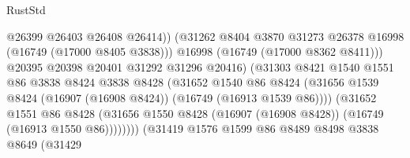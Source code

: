 \begin{lexlean}{RustStd}
\begin{coremodule}
                                            @26399
                                            @26403
                                            @26408
                                            @26414))
                                        (@31262
                                          @8404
                                          @3870
                                          @31273
                                          @26378
                                          @16998
                                          (@16749 (@17000 @8405 @3838)))
                                        @16998
                                        (@16749 (@17000 @8362 @8411)))
                                      @20395
                                      @20398
                                      @20401
                                      @31292
                                      @31296
                                      @20416)
                                    (@31303
                                      @8421
                                      @1540
                                      @1551
                                      @86
                                      @3838
                                      @8424
                                      @3838
                                      @8428
                                      (@31652
                                        @1540
                                        @86
                                        @8424
                                        (@31656
                                          @1539
                                          @8424
                                          (@16907 (@16908 @8424))
                                          (@16749 (@16913 @1539 @86))))
                                      (@31652
                                        @1551
                                        @86
                                        @8428
                                        (@31656
                                          @1550
                                          @8428
                                          (@16907 (@16908 @8428))
                                          (@16749 (@16913 @1550 @86))))))))
                              (@31419
                                @1576
                                @1599
                                @86
                                @8489
                                @8498
                                @3838
                                @8649
                                (@31429

\end{coremodule}
\end{lexlean}
